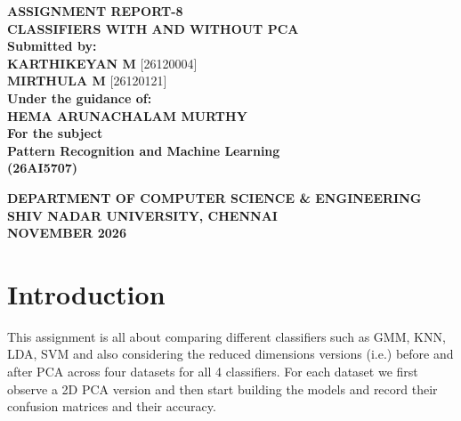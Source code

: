 \documentclass[11pt,a4paper]{article}
\begin{document}
\begin{titlepage}



\centering
\vspace*{2cm}
{\Large\textbf{ASSIGNMENT REPORT-8}}\\[0.7cm]
{\large\textbf{CLASSIFIERS WITH AND WITHOUT PCA}}\\[1.7cm]
\textbf{Submitted by:}\\[0.4cm]
\textbf{KARTHIKEYAN M} [26120004]\\[0.3cm]
\textbf{MIRTHULA M} [26120121]\\[1.8cm]
\textbf{Under the guidance of:}\\[0.4cm]
\textbf{HEMA ARUNACHALAM MURTHY}\\[1.5cm]
\textbf{For the subject}\\[0.4cm]
{\Large\textbf{Pattern Recognition and Machine Learning}}\\[0.3cm]
\textbf{(26AI5707)}
\vspace{2cm}

{\textbf{DEPARTMENT OF COMPUTER SCIENCE \& ENGINEERING}\\[0.3cm]
\textbf{SHIV NADAR UNIVERSITY, CHENNAI}\\[0.3cm]
\textbf{NOVEMBER 2026}}
\end{titlepage}
\section*{Introduction}

This assignment is all about comparing different classifiers such as GMM, KNN, LDA, SVM and also considering the reduced dimensions versions (i.e.) before and after PCA across four datasets for all 4 classifiers. For each dataset we first observe a 2D PCA version and then start building the models and record their confusion matrices and their accuracy.
\end{document}
